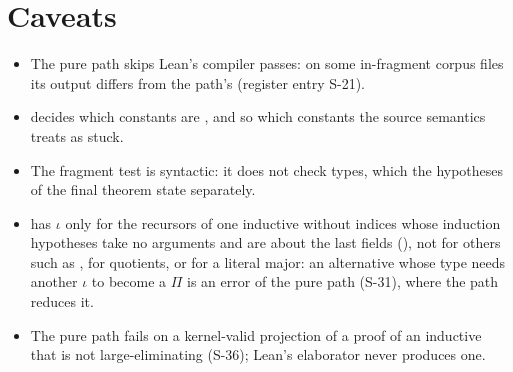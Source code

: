\section*{Caveats}
\begin{itemize}
\item {} The pure path skips Lean's compiler passes: on some in-fragment corpus files
  its output differs from the  path's (register entry S-21).
\item {}  decides which constants are , and
  so which constants the source semantics treats as stuck.
\item {} The fragment test is syntactic: it does not check types, which the
  hypotheses of the final theorem state separately.
\item {}  has $\iota$ only for the recursors of one inductive without
  indices whose induction hypotheses take no arguments and are about the last fields
  (), not for others such as , for quotients, or for a 
  literal major: an alternative whose type needs another $\iota$ to become a $\Pi$ is an error of
  the pure path (S-31), where the  path reduces it.
\item {} The pure path fails on a kernel-valid projection of a proof of an inductive
  that is not large-eliminating (S-36); Lean's elaborator never produces one.
\end{itemize}
